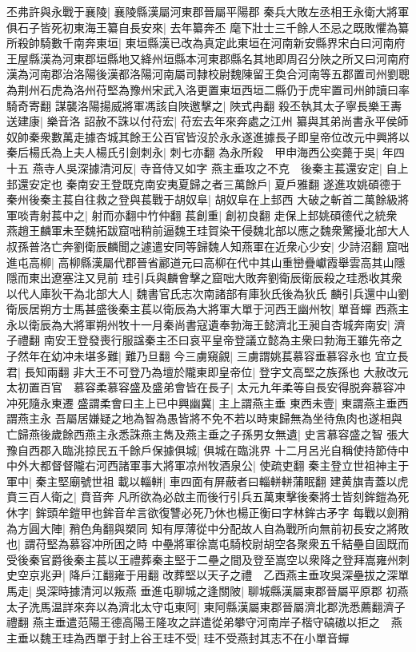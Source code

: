丕弗許與永戰于襄陵|{
	襄陵縣漢屬河東郡晉屬平陽郡}
秦兵大敗左丞相王永衛大將軍俱石子皆死初東海王纂自長安來|{
	去年纂奔丕}
麾下壯士三千餘人丕忌之既敗懼為纂所殺帥騎數千南奔東垣|{
	東垣縣漢已改為真定此東垣在河南新安縣界宋白曰河南府王屋縣漢為河東郡垣縣地又絳州垣縣本河東郡縣名其地即周召分陜之所又曰河南府漢為河南郡治洛陽後漢都洛陽河南屬司隸校尉魏陳留王奐合河南等五郡置司州劉聰為荆州石虎為洛州苻堅為豫州宋武入洛更置東垣西垣二縣仍于虎牢置司州帥讀曰率騎奇寄翻}
謀襲洛陽揚威將軍馮該自陜邀擊之|{
	陜式冉翻}
殺丕執其太子寧長樂王夀送建康|{
	樂音洛}
詔赦不誅以付苻宏|{
	苻宏去年來奔處之江州}
纂與其弟尚書永平侯師奴帥秦衆數萬走據杏城其餘王公百官皆沒於永永遂進據長子即皇帝位改元中興將以秦后楊氏為上夫人楊氏引劍刺永|{
	刺七亦翻}
為永所殺　甲申海西公奕薨于吳|{
	年四十五}
燕寺人吳深據清河反|{
	寺音侍又如字}
燕主垂攻之不克　後秦主萇還安定|{
	自上邽還安定也}
秦南安王登既克南安夷夏歸之者三萬餘戶|{
	夏戶雅翻}
遂進攻姚碩德于秦州後秦主萇自往救之登與萇戰于胡奴阜|{
	胡奴阜在上邽西}
大破之斬首二萬餘級將軍啖青射萇中之|{
	射而亦翻中竹仲翻}
萇創重|{
	創初良翻}
走保上邽姚碩德代之統衆　燕趙王麟軍未至魏拓跋窟咄稍前逼魏王珪賀染干侵魏北部以應之魏衆驚擾北部大人叔孫普洛亡奔劉衛辰麟聞之遽遣安同等歸魏人知燕軍在近衆心少安|{
	少詩沼翻}
窟咄進屯高柳|{
	高柳縣漢屬代郡晉省酈道元曰高柳在代中其山重巒疊巘霞舉雲高其山隱隱而東出遼塞注又見前}
珪引兵與麟會擊之窟咄大敗奔劉衛辰衛辰殺之珪悉收其衆以代人庫狄干為北部大人|{
	魏書官氏志次南諸部有庫狄氏後為狄氏}
麟引兵還中山劉衛辰居朔方士馬甚盛後秦主萇以衛辰為大將軍大單于河西王幽州牧|{
	單音蟬}
西燕主永以衛辰為大將軍朔州牧十一月秦尚書寇遺奉勃海王懿濟北王昶自杏城奔南安|{
	濟子禮翻}
南安王登發喪行服諡秦主丕曰哀平皇帝登議立懿為主衆曰勃海王雖先帝之子然年在幼冲未堪多難|{
	難乃旦翻}
今三虜窺覦|{
	三虜謂姚萇慕容垂慕容永也}
宜立長君|{
	長知兩翻}
非大王不可登乃為壇於隴東即皇帝位|{
	登字文高堅之族孫也}
大赦改元太初置百官　慕容柔慕容盛及盛弟會皆在長子|{
	太元九年柔等自長安得脱奔慕容冲冲死隨永東遷}
盛謂柔會曰主上已中興幽冀|{
	主上謂燕主垂}
東西未壹|{
	東謂燕主垂西謂燕主永}
吾屬居嫌疑之地為智為愚皆將不免不若以時東歸無為坐待魚肉也遂相與亡歸燕後歲餘西燕主永悉誅燕主雋及燕主垂之子孫男女無遺|{
	史言慕容盛之智}
張大豫自西郡入臨洮掠民五千餘戶保據俱城|{
	俱城在臨洮界}
十二月呂光自稱使持節侍中中外大都督督隴右河西諸軍事大將軍凉州牧酒泉公|{
	使疏吏翻}
秦主登立世祖神主于軍中|{
	秦主堅廟號世祖}
載以輜軿|{
	車四面有屏蔽者曰輜軿軿蒲眠翻}
建黄旗青蓋以虎賁三百人衛之|{
	賁音奔}
凡所欲為必啟主而後行引兵五萬東擊後秦將士皆刻鉾鎧為死休字|{
	鉾頭牟鎧甲也鉾音牟言欲復讐必死乃休也楊正衡曰字林鉾古矛字}
每戰以劍矟為方圓大陣|{
	矟色角翻與槊同}
知有厚薄從中分配故人自為戰所向無前初長安之將敗也|{
	謂苻堅為慕容冲所困之時}
中壘將軍徐嵩屯騎校尉胡空各聚衆五千結壘自固既而受後秦官爵後秦主萇以王禮葬秦主堅于二壘之間及登至嵩空以衆降之登拜嵩雍州刺史空京兆尹|{
	降戶江翻雍于用翻}
改葬堅以天子之禮　乙酉燕主垂攻吳深壘拔之深單馬走|{
	吳深時據清河以叛燕}
垂進屯聊城之逢關陂|{
	聊城縣漢屬東郡晉屬平原郡}
初燕太子洗馬温詳來奔以為濟北太守屯東阿|{
	東阿縣漢屬東郡晉屬濟北郡洗悉薦翻濟子禮翻}
燕主垂遣范陽王德高陽王隆攻之詳遣從弟攀守河南岸子楷守碻磝以拒之　燕主垂以魏王珪為西單于封上谷王珪不受|{
	珪不受燕封其志不在小單音蟬}


